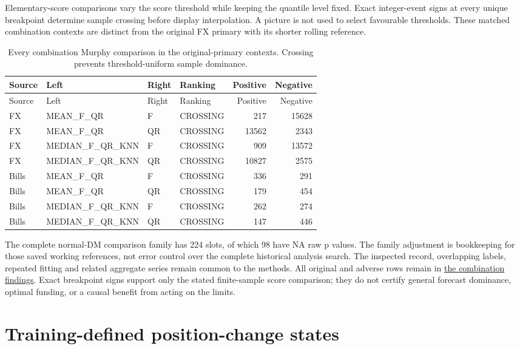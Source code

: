 \documentclass[11pt,a4paper]{article}
\begin{document}
Elementary-score comparisons vary the score threshold while
keeping the quantile level fixed. Exact integer-event signs at every unique
breakpoint determine sample crossing before display interpolation. A picture
is not used to select favourable thresholds. These matched combination
contexts are distinct from the original FX primary with its shorter rolling
reference.
\begingroup
\scriptsize
\setlength{\tabcolsep}{3pt}
\renewcommand{\arraystretch}{1.12}
\begin{longtable}{lp{34mm}p{18mm}lrr}
\caption{Every combination Murphy comparison in the original-primary contexts. Crossing prevents threshold-uniform sample dominance.}\\
\toprule
Source & Left & Right & Ranking & Positive & Negative \\
\midrule
\endfirsthead
\toprule
Source & Left & Right & Ranking & Positive & Negative \\
\midrule
\endhead
\bottomrule
\endfoot
FX & MEAN\_F\_QR & F & CROSSING & 217 & 15628 \\
FX & MEAN\_F\_QR & QR & CROSSING & 13562 & 2343 \\
FX & MEDIAN\_F\_QR\_KNN & F & CROSSING & 909 & 13572 \\
FX & MEDIAN\_F\_QR\_KNN & QR & CROSSING & 10827 & 2575 \\
Bills & MEAN\_F\_QR & F & CROSSING & 336 & 291 \\
Bills & MEAN\_F\_QR & QR & CROSSING & 179 & 454 \\
Bills & MEDIAN\_F\_QR\_KNN & F & CROSSING & 262 & 274 \\
Bills & MEDIAN\_F\_QR\_KNN & QR & CROSSING & 147 & 446 \\
\end{longtable}
\endgroup

The complete normal-DM comparison family has 224 slots,
of which 98 have NA raw p values.
The family adjustment is bookkeeping for those saved working references, not
error control over the complete historical analysis search. The inspected
record, overlapping labels, repeated fitting and related aggregate series
remain common to the methods. All original and adverse rows remain in
\href{https://github.com/ByronLi0207/financial-mathematics-paper-20261020/blob/revision-v7-final/results/revision-20261023/v6/wp3-findings.json}{the combination findings}.
Exact breakpoint signs support only the stated finite-sample score comparison;
they do not certify general forecast dominance, optimal funding, or a causal
benefit from acting on the limits.\section{Training-defined position-change states}\label{sup:wp4}
\end{document}
